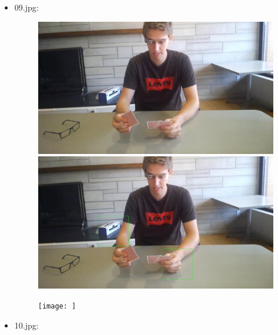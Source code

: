 \begin{itemize}
\begin{figure}[!htb]
        \end{figure}
    \newpage
    \item 09.jpg:
        \begin{figure}[!htb]
            \begin{minipage}{0.33\textwidth}
            \centering
            \includegraphics[scale = 0.135]{images/results/original/09.jpg}
            \end{minipage}\hfill
            \begin{minipage}{0.33\textwidth}
                \centering
                \includegraphics[scale = 0.135]{images/results/detection/09_detections.jpg}
            \end{minipage}\hfill
            \begin{minipage}{0.33\textwidth}
                \centering
                \texttt{[image: ]}
            \end{minipage}
        \end{figure}
    \item 10.jpg:
        \begin{figure}[!htb]
            \begin{minipage}{0.33\textwidth}

\end{minipage}
\end{figure}
\end{itemize}
